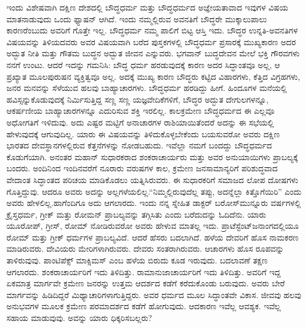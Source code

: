 ಇಂದು ವಿಶೇಷವಾಗಿ ದಕ್ಷಿಣ ದೇಶದಲ್ಲಿ ಬೌದ್ಧಧರ್ಮ ಮತ್ತು ಬೌದ್ಧಧರ್ಮದ ಅಜ್ಞೇಯತಾವಾದ ಇವುಗಳ ವಿಷಯ ಮಾತನಾಡುವುದು ಒಂದು ಫ್ಯಾಷನ್​ ಆಗಿದೆ. ಇಂದು ನಮ್ಮಲ್ಲಿರುವ ಅವನತಿಗೆ ಬೌದ್ಧರೇ ಮುಕ್ಕಾಲುಪಾಲು ಕಾರಣರೆಂಬುದು ಅವರಿಗೆ ಗೊತ್ತೇ ಇಲ್ಲ. ಬೌದ್ಧಧರ್ಮ ನಮ್ಮ ಪಾಲಿಗೆ ಬಿಟ್ಟ ಆಸ್ತಿ ಇದು. ಬೌದ್ಧರ ಉನ್ನತಿ-ಅವನತಿಗಳ ವಿಷಯವನ್ನು ತಿಳಿಯದವರು ಅವರ ವಿಷಯವಾಗಿ ಬರೆದ ಪುಸ್ತಕಗಳಲ್ಲಿ ಬೌದ್ಧಧರ್ಮ ಪ್ರಸಾರಕ್ಕೆ ಮುಖ್ಯಕಾರಣ ಅದರ ಅದ್ಭುತ ನೀತಿ ಮತ್ತು ಗೌತಮ ಬುದ್ಧನ ಅದ್ಭುತ ಜೀವನ ಎನ್ನುವರು. ಭಗವಾನ್​ ಬುದ್ಧದೇವನ ಮೇಲೆ ಭಕ್ತಿ ಗೌರವಗಳು ನನಗೆ ಉಂಟು. ಆದರೆ ಇದನ್ನು ಗಮನಿಸಿ: ಬೌದ್ಧ ಧರ್ಮ ಹರಡುವುದಕ್ಕೆ ಕಾರಣ ಅದರ ಸಿದ್ಧಾಂತವೂ ಅಲ್ಲ, ಆ ಪ್ರಖ್ಯಾತ ಮೂಲಪುರುಷನ ವ್ಯಕ್ತಿತ್ವವೂ ಅಲ್ಲ. ಅದಕ್ಕೆ ಮುಖ್ಯ ಕಾರಣ ಬೌದ್ಧರು ಕಟ್ಟಿದ ವಿಹಾರಗಳು, ಕೆತ್ತಿದ ವಿಗ್ರಹಗಳು, ಜನರ ಮನವನ್ನು ಸೆಳೆಯುವ ಹಲವು ಬಾಹ್ಯಾಚಾರಗಳು. ಬೌದ್ಧಧರ್ಮ ಹರಡಿದ್ದು ಹೀಗೆ. ಹಿಂದೂಗಳ ಮನೆಯಲ್ಲಿ ಹವಿಸ್ಸನ್ನು\break ಕೊಡುವುದಕ್ಕೆ ನಿರ್ಮಿಸುತ್ತಿದ್ದ ಸಣ್ಣ ಸಣ್ಣ ಯಜ್ಞವೇದಿಕೆಗಳಿಗೆ, ಬೌದ್ಧರ ಅದ್ಭುತ ದೇಗುಲಗಳನ್ನೂ, ಆಕರ್ಷಣೀಯ ಬಾಹ್ಯಾಚಾರಗಳನ್ನೂ ಎದುರಿಸುವ ಶಕ್ತಿ ಇರಲಿಲ್ಲ. ಕಾಲಕ್ರಮೇಣ ಬೌದ್ಧಧರ್ಮದ ಈ ಎಲ್ಲವೂ ಅಧೋಗತಿಗೆ ಇಳಿದುವು. ಅದು ಎಷ್ಟರ ಮಟ್ಟಿಗೆ ಅನಾಚಾರಗಳ ರಾಶಿಯಾಯಿತೆಂದರೆ ಅದನ್ನು ಈ ಸಭೆಯಲ್ಲಿ ಹೇಳುವುದಕ್ಕೆ ಆಗುವುದಿಲ್ಲ. ಯಾರು ಈ ವಿಷಯವನ್ನು ತಿಳಿದುಕೊಳ್ಳಬೇಕೆಂದು ಬಯಸುವರೋ ಅವರು ದಕ್ಷಿಣ ಭಾರತದ ದೇವಸ್ಥಾನಗಳಲ್ಲಿರುವ ಕೆತ್ತನೆಗಳನ್ನು ನೋಡಬಹುದು. ಇವೆಲ್ಲಾ ನಮಗೆ ಬಂದದ್ದು ಬೌದ್ಧಧರ್ಮದ ಕೊಡುಗೆಯಾಗಿ. ಅನಂತರ ಮಹಾನ್​ ಸುಧಾರಕರಾದ ಶಂಕರಾಚಾರ್ಯರು ಮತ್ತು ಅವರ ಅನುಯಾಯಿಗಳು ಪ್ರಾಬಲ್ಯಕ್ಕೆ ಬಂದರು. ಅಂದಿನಿಂದ ಇಂದಿನವರೆಗೆ ನೂರಾರು ವರುಷಗಳ ಕಾಲ, ಕ್ರಮೇಣ ಜನಸಾಮಾನ್ಯರಿಗೆ ಪರಿಶುದ್ಧವಾದ ವೇದಾಂತ ಸಿದ್ಧಾಂತದ ಪರಿಚಯ ಮಾಡಿಕೊಡಲು ಯತ್ನಿಸಿರುವರು. ಈ ಸುಧಾರಕರಿಗೆ ಸಮಾಜದ ಲೋಪ ದೋಷಗಳು ಗೊತ್ತಿದ್ದುವು. ಆದರೂ ಅವರು ಅದನ್ನು ಅಲ್ಲಗಳೆಯಲಿಲ್ಲ.\break ``ನಿಮ್ಮಲ್ಲಿರುವುದೆಲ್ಲ ತಪ್ಪು, ಅದನ್ನೆಲ್ಲಾ ಕಿತ್ತೊಗೆಯಿರಿ” ಎಂದು ಅವರು ಹೇಳಲಿಲ್ಲ.\break ಹಾಗೆಂದಿಗೂ ಅದು ಆಗಲಾರದು. ಇಂದು ನನ್ನ ಸ್ನೇಹಿತ ಡಾಕ್ಟರ್​ ಬರೋಸ್​ ಮುನ್ನೂರು ವರ್ಷಗಳಲ್ಲಿ ಕ್ರೈಸ್ತಧರ್ಮ, ಗ್ರೀಕ್​ ಮತ್ತು ರೋಮನ್​ ಪ್ರಾಬಲ್ಯವನ್ನು ತಗ್ಗಿಸಿತು ಎಂದು ಬರೆದುದನ್ನು ಓದಿದೆನು. ಯಾರು ಯೂರೋಪ್​, ಗ್ರೀಸ್​, ರೋಮ್​ ನೋಡಿರುವರೋ ಅವರು ಹೇಳುವ ಮಾತಲ್ಲ ಇದು. ಪ್ರಾಟೆಸ್ಟೆಂಟ್​ ಜನಾಂಗದಲ್ಲಿಯೂ ರೋಮ್​ ಮತ್ತು ಗ್ರೀಕ್​ ಧರ್ಮಗಳ ಪ್ರಾಬಲ್ಯವಿದೆ. ಆದರೆ ಹೆಸರು ಬದಲಾಗಿದೆ. ಹಳೆಯ ದೇವರಿಗೆ ಹೊಸ ನಾಮಕರಣ ಮಾಡಿರುವರು. ದೇವಿಯರು ಮೇರಿಗಳಾಗಿರುವರು. ದೇವರು ಸಂತರಾಗಿರುವರು. ಆಚಾರಗಳು ಹೊಸ ರೂಪವನ್ನು ತಾಳಿರುವುವು. ಪಾಂಟಿಪೆಕ್ಸ್ ಮಾಕ್ಸಿಮಸ್​ ಎಂಬ ಹಳೆಯ ಬಿರುದು ಕೂಡ ಇರುವುದು. ಬದಲಾವಣೆ ತಕ್ಷಣ ಆಗಲಾರದು. ಶಂಕರಾಚಾರ್ಯರಿಗೆ ಇದು ತಿಳಿದಿತ್ತು. ರಾಮಾನುಜಾಚಾರ್ಯರಿಗೆ ಇದು ತಿಳಿದಿತ್ತು. ಅವರಿಗೆ ಇದ್ದ ಏಕಮಾತ್ರ ಮಾರ್ಗವೇ ಕ್ರಮೇಣ ಜನರನ್ನು ಉತ್ತಮ ಆದರ್ಶದ ಕಡೆಗೆ ಕರೆದುಕೊಂಡು ಬರುವುದು. ಅವರು ಬೇರೆ ಮಾರ್ಗವನ್ನು ಹಿಡಿದಿದ್ದರೆ ಮಿಥ್ಯಾಚಾರಿಗಳಾಗುತ್ತಿದ್ದರು. ಅವರ ಧರ್ಮದ ಮೂಲ ಸಿದ್ಧಾಂತವೇ ವಿಕಾಸ. ಜೀವವು ಹಲವು ಅನುಭವಗಳ ಮೂಲಕ ಕ್ರಮೇಣ ಪರಮಾದರ್ಶದ ಕಡೆಗೆ ಹೋಗುವುದು. ಆದಕಾರಣ ಇವೆಲ್ಲ ಆವಶ್ಯಕ. ಇವೆಲ್ಲ ಸಹಾಯ ಮಾಡುವುವು. ಅವನ್ನು ಯಾರು ಧಿಕ್ಕರಿಸಬಲ್ಲರು?

\vskip   4pt

